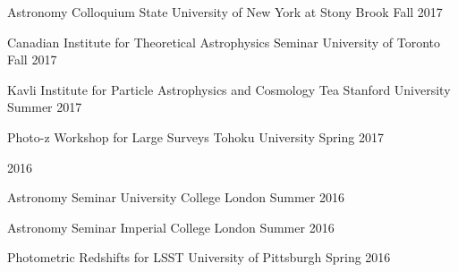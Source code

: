 \documentclass[11pt,letterpaper]{article}
\begin{document}
\begin{list}{}{\malzlist}
\begin{list}{}{\malzlist}
  {Astronomy Colloquium}
	{State University of New York at Stony Brook}
	{Fall 2017}
\item {}
  {Canadian Institute for Theoretical Astrophysics Seminar}
	{University of Toronto}
	{Fall 2017}
\item {}
  {Kavli Institute for Particle Astrophysics and Cosmology Tea}
	{Stanford University}
	{Summer 2017}
\item {}
  {Photo-z Workshop for Large Surveys}
	{Tohoku University}
	{Spring 2017}
\end{list}
\item 2016
\nopagebreak\begin{list}{}{\malzlist}
\item {}
  {Astronomy Seminar}
	{University College London}
	{Summer 2016}
\item {}
  {Astronomy Seminar}
	{Imperial College London}
	{Summer 2016}
\item {}
  {Photometric Redshifts for LSST}
	{University of Pittsburgh}
	{Spring 2016}
\end{list}
\end{list}
\end{document}
